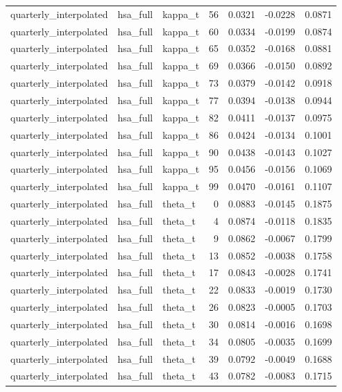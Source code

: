 \begin{tabular}{lllrrrr}
quarterly\_interpolated & hsa\_full & kappa\_t & 56 & 0.0321 & -0.0228 & 0.0871 \\
quarterly\_interpolated & hsa\_full & kappa\_t & 60 & 0.0334 & -0.0199 & 0.0874 \\
quarterly\_interpolated & hsa\_full & kappa\_t & 65 & 0.0352 & -0.0168 & 0.0881 \\
quarterly\_interpolated & hsa\_full & kappa\_t & 69 & 0.0366 & -0.0150 & 0.0892 \\
quarterly\_interpolated & hsa\_full & kappa\_t & 73 & 0.0379 & -0.0142 & 0.0918 \\
quarterly\_interpolated & hsa\_full & kappa\_t & 77 & 0.0394 & -0.0138 & 0.0944 \\
quarterly\_interpolated & hsa\_full & kappa\_t & 82 & 0.0411 & -0.0137 & 0.0975 \\
quarterly\_interpolated & hsa\_full & kappa\_t & 86 & 0.0424 & -0.0134 & 0.1001 \\
quarterly\_interpolated & hsa\_full & kappa\_t & 90 & 0.0438 & -0.0143 & 0.1027 \\
quarterly\_interpolated & hsa\_full & kappa\_t & 95 & 0.0456 & -0.0156 & 0.1069 \\
quarterly\_interpolated & hsa\_full & kappa\_t & 99 & 0.0470 & -0.0161 & 0.1107 \\
quarterly\_interpolated & hsa\_full & theta\_t & 0 & 0.0883 & -0.0145 & 0.1875 \\
quarterly\_interpolated & hsa\_full & theta\_t & 4 & 0.0874 & -0.0118 & 0.1835 \\
quarterly\_interpolated & hsa\_full & theta\_t & 9 & 0.0862 & -0.0067 & 0.1799 \\
quarterly\_interpolated & hsa\_full & theta\_t & 13 & 0.0852 & -0.0038 & 0.1758 \\
quarterly\_interpolated & hsa\_full & theta\_t & 17 & 0.0843 & -0.0028 & 0.1741 \\
quarterly\_interpolated & hsa\_full & theta\_t & 22 & 0.0833 & -0.0019 & 0.1730 \\
quarterly\_interpolated & hsa\_full & theta\_t & 26 & 0.0823 & -0.0005 & 0.1703 \\
quarterly\_interpolated & hsa\_full & theta\_t & 30 & 0.0814 & -0.0016 & 0.1698 \\
quarterly\_interpolated & hsa\_full & theta\_t & 34 & 0.0805 & -0.0035 & 0.1699 \\
quarterly\_interpolated & hsa\_full & theta\_t & 39 & 0.0792 & -0.0049 & 0.1688 \\
quarterly\_interpolated & hsa\_full & theta\_t & 43 & 0.0782 & -0.0083 & 0.1715 \\

\end{tabular}
